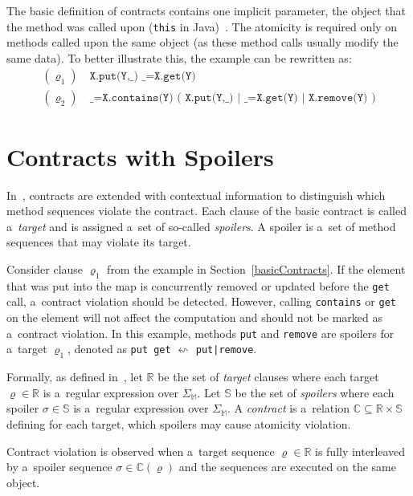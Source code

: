 \medskip
The basic definition of contracts contains one implicit parameter, the object
that the method was called upon (\texttt{this} in Java)~\cite{FITPUB10817}. The
atomicity is required only on methods called upon the same object (as these
method calls usually modify the same data). To better illustrate this, the
example can be rewritten as:
\begin{align*}
    (\varrho_1) &\ \texttt{X.put(Y,\_) \_=X.get(Y)}\\
    (\varrho_2) &\ \texttt{\_=X.contains(Y) ( X.put(Y,\_) | \_=X.get(Y) |
    X.remove(Y) )}
\end{align*}


\section{Contracts with Spoilers}
\label{contractsWithSpoilers}

In~\cite{contracts}, contracts are extended with contextual information to
distinguish which method sequences violate the contract. Each clause of the
basic contract is called a~\emph{target} and is assigned a~set of so-called
\emph{spoilers}. A spoiler is a~set of method sequences that may violate its
target.

Consider clause $\varrho_1$ from the example in Section~\ref{basicContracts}. If
the element that was put into the map is concurrently removed or updated before
the \texttt{get} call, a~contract violation should be detected.  However,
calling \texttt{contains} or \texttt{get} on the element will not affect the
computation and should not be marked as a~contract violation. In this example,
methods \texttt{put} and \texttt{remove} are spoilers for a~target
$\varrho_1$, denoted as \texttt{put get} $\leftsquigarrow$ \texttt{put|remove}.

Formally, as defined in~\cite{contracts}, let $\mathbb{R}$ be the set of
\emph{target} clauses where each target $\varrho \in \mathbb{R}$ is a~regular
expression over $\Sigma_\mathbb{M}$. Let $\mathbb{S}$ be the set of
\emph{spoilers} where each spoiler $\sigma \in \mathbb{S}$ is a~regular
expression over $\Sigma_\mathbb{M}$. A \emph{contract} is a~relation $\mathbb{C}
\subseteq \mathbb{R} \times \mathbb{S}$ defining for each target, which spoilers
may cause atomicity violation.

Contract violation is observed when a~target sequence $\varrho \in \mathbb{R}$
is fully interleaved by a~spoiler sequence $\sigma \in \mathbb{C}(\varrho)$ and
the sequences are executed on the same object.

